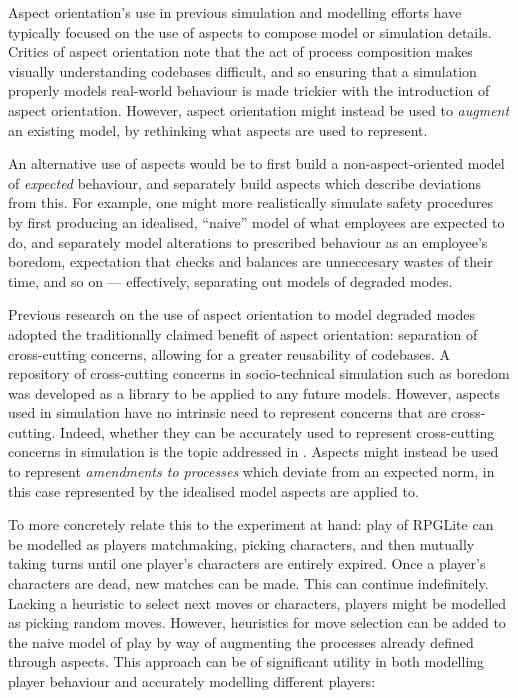 Aspect orientation's use in previous simulation and modelling efforts have
typically focused on the use of aspects to compose model or simulation
details.
Critics of aspect orientation note that
the act of process composition makes visually understanding codebases difficult,
and so ensuring that a simulation properly models real-world behaviour is made
trickier with the introduction of aspect orientation. However, aspect
orientation might instead be used to \emph{augment} an existing model, by
rethinking what aspects are used to represent.

An alternative use of aspects would be to first build a non-aspect-oriented
model of \emph{expected} behaviour, and separately build aspects which describe
deviations from this. For example, one might more realistically simulate safety
procedures by first producing an idealised, ``naive'' model of what employees
are expected to do, and separately model alterations to prescribed behaviour as
an employee's boredom, expectation that checks and balances are unneccesary
wastes of their time, and so on --- effectively, separating out models of
degraded modes\cite{johnson2007degradedmodes}.

Previous research on the use of aspect orientation to model degraded modes
adopted the traditionally claimed benefit of aspect orientation: separation of
cross-cutting concerns, allowing for a greater reusability of
codebases\cite{wallis2018caise}. A repository of cross-cutting concerns in
socio-technical simulation such as boredom was developed as a library to be
applied to any future models\cite{fuzzimoss_repo}. However, aspects used in
simulation have no intrinsic need to represent concerns that are cross-cutting.
Indeed, whether they can be accurately used to represent cross-cutting concerns
in simulation is the topic addressed in . Aspects
might instead be used to represent \emph{amendments to processes} which deviate
from an expected norm, in this case represented by the idealised model aspects
are applied to.

To more concretely relate this to the experiment at hand: play of RPGLite can be
modelled as players matchmaking, picking characters, and then mutually taking
turns until one player's characters are entirely expired. Once a player's
characters are dead, new matches can be made. This can continue indefinitely.
Lacking a heuristic to select next moves or characters, players might be
modelled as picking random moves. However, heuristics for move selection can be
added to the naive model of play by way of augmenting the processes already
defined through aspects. This approach can be of significant utility in both
modelling player behaviour and accurately modelling different players:

